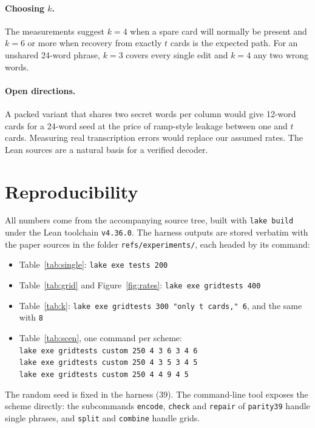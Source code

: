 \documentclass[numeric]{anvil-paper}
\newcommand{\code}[1]{\texttt{#1}}
\begin{document}
\paragraph{Choosing $k$.}
The measurements suggest $k=4$ when a spare card will normally be present and
$k=6$ or more when recovery from exactly $t$ cards is the expected path. For an
unshared 24-word phrase, $k=3$ covers every single edit and $k=4$ any two wrong
words.

\paragraph{Open directions.}
A packed variant that shares two secret words per column would give 12-word
cards for a 24-word seed at the price of ramp-style leakage between one and
$t$ cards. Measuring real transcription errors would replace our assumed rates.
The Lean sources are a natural basis for a verified decoder.

\section{Reproducibility}
\label{sec:repro}

All numbers come from the accompanying source tree, built with \code{lake build}
under the Lean toolchain \code{v4.36.0}. The harness outputs are stored
verbatim with the paper sources in the folder \code{refs/experiments/}, each
headed by its command:
\begin{itemize}
\item Table~\ref{tab:single}: \code{lake exe tests 200}
\item Table~\ref{tab:grid} and Figure~\ref{fig:rates}:
  \code{lake exe gridtests 400}
\item Table~\ref{tab:k}: \code{lake exe gridtests 300 "only t cards," 6},
  and the same with \code{8}
\item Table~\ref{tab:scen}, one command per scheme:\\
  \code{lake exe gridtests custom 250 4 3 6 3 4 6}\\
  \code{lake exe gridtests custom 250 4 3 5 3 4 5}\\
  \code{lake exe gridtests custom 250 4 4 9 4 5}
\end{itemize}
The random seed is fixed in the harness (39). The command-line tool exposes
the scheme directly: the subcommands \code{encode}, \code{check} and
\code{repair} of \code{parity39} handle single phrases, and \code{split} and
\code{combine} handle grids.
\end{document}
